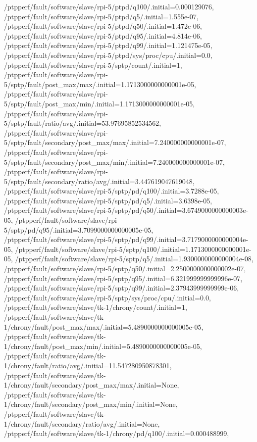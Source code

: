 {    /ptpperf/fault/software/slave/rpi-5/ptpd/q100/.initial=0.000129076,
    /ptpperf/fault/software/slave/rpi-5/ptpd/q5/.initial=1.555e-07,
    /ptpperf/fault/software/slave/rpi-5/ptpd/q50/.initial=1.472e-06,
    /ptpperf/fault/software/slave/rpi-5/ptpd/q95/.initial=4.814e-06,
    /ptpperf/fault/software/slave/rpi-5/ptpd/q99/.initial=1.121475e-05,
    /ptpperf/fault/software/slave/rpi-5/ptpd/sys/proc/cpu/.initial=0.0,
    /ptpperf/fault/software/slave/rpi-5/sptp/count/.initial=1,
    /ptpperf/fault/software/slave/rpi-5/sptp/fault/post_max/max/.initial=1.1713000000000001e-05,
    /ptpperf/fault/software/slave/rpi-5/sptp/fault/post_max/min/.initial=1.1713000000000001e-05,
    /ptpperf/fault/software/slave/rpi-5/sptp/fault/ratio/avg/.initial=53.97695852534562,
    /ptpperf/fault/software/slave/rpi-5/sptp/fault/secondary/post_max/max/.initial=7.240000000000001e-07,
    /ptpperf/fault/software/slave/rpi-5/sptp/fault/secondary/post_max/min/.initial=7.240000000000001e-07,
    /ptpperf/fault/software/slave/rpi-5/sptp/fault/secondary/ratio/avg/.initial=3.447619047619048,
    /ptpperf/fault/software/slave/rpi-5/sptp/pd/q100/.initial=3.7288e-05,
    /ptpperf/fault/software/slave/rpi-5/sptp/pd/q5/.initial=3.6398e-05,
    /ptpperf/fault/software/slave/rpi-5/sptp/pd/q50/.initial=3.6749000000000003e-05,
    /ptpperf/fault/software/slave/rpi-5/sptp/pd/q95/.initial=3.7099000000000005e-05,
    /ptpperf/fault/software/slave/rpi-5/sptp/pd/q99/.initial=3.7179000000000004e-05,
    /ptpperf/fault/software/slave/rpi-5/sptp/q100/.initial=1.1713000000000001e-05,
    /ptpperf/fault/software/slave/rpi-5/sptp/q5/.initial=1.9300000000000004e-08,
    /ptpperf/fault/software/slave/rpi-5/sptp/q50/.initial=2.2500000000000002e-07,
    /ptpperf/fault/software/slave/rpi-5/sptp/q95/.initial=6.321999999999996e-07,
    /ptpperf/fault/software/slave/rpi-5/sptp/q99/.initial=2.37943999999999e-06,
    /ptpperf/fault/software/slave/rpi-5/sptp/sys/proc/cpu/.initial=0.0,
    /ptpperf/fault/software/slave/tk-1/chrony/count/.initial=1,
    /ptpperf/fault/software/slave/tk-1/chrony/fault/post_max/max/.initial=5.4890000000000005e-05,
    /ptpperf/fault/software/slave/tk-1/chrony/fault/post_max/min/.initial=5.4890000000000005e-05,
    /ptpperf/fault/software/slave/tk-1/chrony/fault/ratio/avg/.initial=11.547280950878301,
    /ptpperf/fault/software/slave/tk-1/chrony/fault/secondary/post_max/max/.initial=None,
    /ptpperf/fault/software/slave/tk-1/chrony/fault/secondary/post_max/min/.initial=None,
    /ptpperf/fault/software/slave/tk-1/chrony/fault/secondary/ratio/avg/.initial=None,
    /ptpperf/fault/software/slave/tk-1/chrony/pd/q100/.initial=0.000488999,
}
